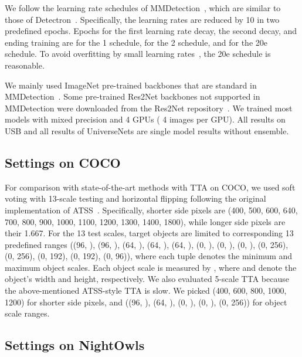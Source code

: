 \documentclass[10pt,twocolumn,letterpaper]{article}
\newcommand{\Univs}{UniverseNets\xspace}
\begin{document}
We follow the learning rate schedules of MMDetection~\cite{MMDetection}, which are similar to those of Detectron~\cite{Detectron2018}.
Specifically, the learning rates are reduced by 10 in two predefined epochs.
Epochs for the first learning rate decay, the second decay, and ending training are
 for the 1 schedule,
 for the 2 schedule, and
 for the 20e schedule.
To avoid overfitting by small learning rates~\cite{Shinya_ICCVW2019},
the 20e schedule is reasonable.


We mainly used ImageNet pre-trained backbones that are standard in MMDetection~\cite{MMDetection}.
Some pre-trained Res2Net backbones not supported in MMDetection were downloaded from the Res2Net repository~\cite{Res2Net_PretrainedModels}.
We trained most models with mixed precision and 4 GPUs ( 4 images per GPU).
All results on USB and all results of \Univs are single model results without ensemble.






\subsection{Settings on COCO}


For comparison with state-of-the-art methods with TTA on COCO,
we used soft voting with 13-scale testing and horizontal flipping following the original implementation of ATSS~\cite{ATSS_CVPR2020}.
Specifically,
shorter side pixels are (400, 500, 600, 640, 700, 800, 900, 1000, 1100, 1200, 1300, 1400, 1800),
while longer side pixels are their 1.667.
For the 13 test scales, target objects are limited to corresponding 13 predefined ranges
((96, ), (96, ), (64, ), (64, ), (64, ), (0, ), (0, ), (0, ), (0, 256), (0, 256), (0, 192), (0, 192), (0, 96)),
where each tuple denotes the minimum and maximum object scales.
Each object scale is measured by ,
where  and  denote the object's width and height, respectively.
We also evaluated 5-scale TTA
because the above-mentioned ATSS-style TTA is slow.
We picked (400, 600, 800, 1000, 1200) for shorter side pixels,
and ((96, ), (64, ), (0, ), (0, ), (0, 256)) for object scale ranges.




\subsection{Settings on NightOwls}
\end{document}
